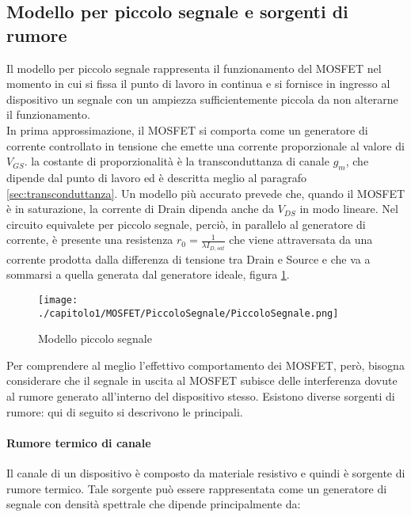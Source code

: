 \subsection{Modello per piccolo segnale e sorgenti di rumore}
Il modello per piccolo segnale rappresenta il funzionamento del MOSFET nel momento in cui si fissa il punto di lavoro in continua e si fornisce in ingresso al dispositivo un segnale con un ampiezza sufficientemente piccola da non alterarne il funzionamento. \\

In prima approssimazione, il MOSFET si comporta come un generatore di corrente controllato in tensione che emette una corrente proporzionale al valore di $V_{GS}$. la costante di proporzionalità è la transconduttanza di canale $g_m$, che dipende dal punto di lavoro ed è descritta meglio al paragrafo \ref{sec:transconduttanza}. Un modello più accurato prevede che, quando il MOSFET è in saturazione, la corrente di Drain dipenda anche da $V_{DS}$ in modo lineare. Nel circuito equivalete per piccolo segnale, perciò, in parallelo al generatore di corrente, è presente una resistenza $r_0 = \frac{1}{\lambda I_{D,sat}}$ che viene attraversata da una corrente prodotta dalla differenza di tensione tra Drain e Source e che va a sommarsi a quella generata dal generatore ideale, figura \ref{fig:piccolo_segnale}.

\begin{figure}[t]
  
  \centering
  \texttt{[image: ./capitolo1/MOSFET/PiccoloSegnale/PiccoloSegnale.png]}
  \caption[Modello piccolo segnale]{Modello piccolo segnale}
  \label{fig:piccolo_segnale}

\end{figure}

\vspace*{0.5cm}

Per comprendere al meglio l'effettivo comportamento dei MOSFET, però, bisogna considerare che il segnale in uscita al MOSFET subisce delle interferenza dovute al rumore generato all'interno del dispositivo stesso. Esistono diverse sorgenti di rumore: qui di seguito si descrivono le principali.

\paragraph*{Rumore termico di canale}
Il canale di un dispositivo è composto da materiale resistivo e quindi è sorgente di rumore termico. Tale sorgente può essere rappresentata come un generatore di segnale con densità spettrale che dipende principalmente da:

